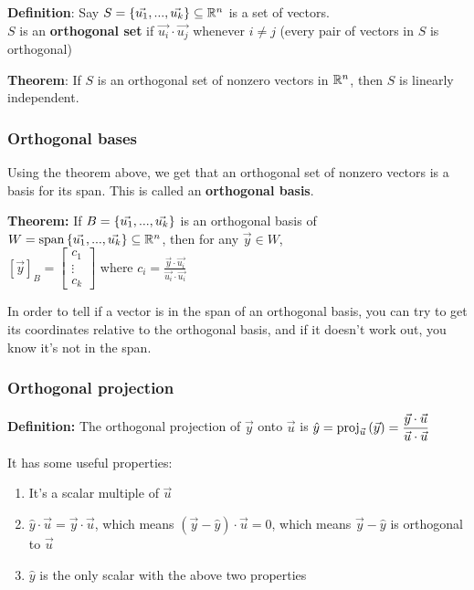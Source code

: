 \textbf{Definition}: Say $S = \left\{\Vec{u_1}, ..., \Vec{u_k}\right\} \subseteq \mathbb{R}^n$ is a set of vectors.\\
$S$ is an \textbf{orthogonal set} if $\Vec{u_i} \cdot \Vec{u_j}$ whenever $i \neq j$ (every pair of vectors in $S$ is orthogonal)

\textbf{Theorem}: If $S$ is an orthogonal set of nonzero vectors in $\mathbb{R}^n$, then $S$ is linearly independent.

\subsubsection*{Orthogonal bases}

Using the theorem above, we get that an orthogonal set of nonzero vectors is a basis for its span. This is called an \textbf{orthogonal basis}.

\textbf{Theorem:} If $B = \left\{\Vec{u_1}, ..., \Vec{u_k}\right\}$ is an orthogonal basis of $W = \mathrm{span}\left\{\Vec{u_1}, ..., \Vec{u_k}\right\} \subseteq \mathbb{R}^n$, then for any $\Vec y \in W$,\\
$\displaystyle \left[\Vec y\right]_B = \begin{bmatrix}c_1 \\ \vdots \\ c_k\end{bmatrix}$ where $\displaystyle c_i = \frac{ \Vec y \cdot \Vec{u_i}}{\Vec{u_i} \cdot \Vec{u_i}}$

In order to tell if a vector is in the span of an orthogonal basis, you can try to get its coordinates relative to the orthogonal basis, and if it doesn't work out, you know it's not in the span.

\subsubsection*{Orthogonal projection}

\textbf{Definition:} The orthogonal projection of $\Vec y$ onto $\Vec u$ is $\displaystyle \hat y = \mathrm{proj}_{\Vec u}\left(\Vec y\right) = \frac{\Vec y \cdot \Vec u}{\Vec u \cdot \Vec u}$

It has some useful properties:
\begin{enumerate}
    \item It's a scalar multiple of $\Vec u$
    \item $\hat y \cdot \Vec u = \Vec y \cdot \Vec u$, which means $(\Vec y - \hat y) \cdot \Vec u = 0$, which means $\Vec y - \hat y$ is orthogonal to $\Vec u$
    \item $\hat y$ is the only scalar with the above two properties
\end{enumerate}

